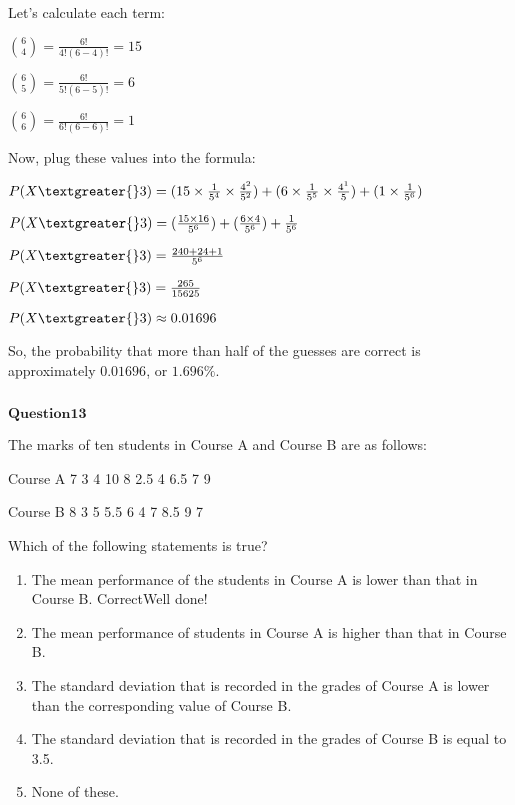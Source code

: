 \documentclass[11pt]{article}
\makeatletter
\providecommand{\tightlist}{%
      \setlength{\itemsep}{0pt}\setlength{\parskip}{0pt}}
\newcommand{\boxspacing}{\kern\kvtcb@left@rule\kern\kvtcb@boxsep}
\newcommand{\prompt}[4]{
        {\ttfamily\llap{{\color{#2}[#3]:\hspace{3pt}#4}}\vspace{-\baselineskip}}
    }
\makeatother
\begin{document}
Let's calculate each term:

$ \binom{6}{4} = \frac{6!}{4!(6-4)!} = 15 $

$ \binom{6}{5} = \frac{6!}{5!(6-5)!} = 6 $

$ \binom{6}{6} = \frac{6!}{6!(6-6)!} = 1 $

Now, plug these values into the formula:

$ P(X \textgreater{} 3) = (15 \times \frac{1}{5^4}
\times \frac{4^2}{5^2}) + (6 \times \frac{1}{5^5} \times \frac{4^1}{5})
+ (1 \times \frac{1}{5^6}) $

$ P(X \textgreater{} 3) = (\frac{15 \times 16}{5^6}) +
(\frac{6 \times 4}{5^6}) + \frac{1}{5^6} $

$ P(X \textgreater{} 3) = \frac{240 + 24 + 1}{5^6} $

$ P(X \textgreater{} 3) = \frac{265}{15625} $

$ P(X \textgreater{} 3) \approx 0.01696 $

So, the probability that more than half of the guesses are correct is
approximately $ 0.01696 $, or $ 1.696\% $.

    \begin{tcolorbox}[breakable, size=fbox, boxrule=1pt, pad at break*=1mm,colback=cellbackground, colframe=cellborder]
\prompt{In}{incolor}{ }{\boxspacing}
\begin{Verbatim}[commandchars=\\\{\}]

\end{Verbatim}
\end{tcolorbox}

    $\textbf{Question13}$

The marks of ten students in Course A and Course B are as follows:

Course A 7 3 4 10 8 2.5 4 6.5 7 9

Course B 8 3 5 5.5 6 4 7 8.5 9 7

Which of the following statements is true?

\begin{enumerate}
\def\labelenumi{\alph{enumi}.}
\tightlist
\item
  The mean performance of the students in Course A is lower than that in
  Course B. CorrectWell done!\\
\item
  The mean performance of students in Course A is higher than that in
  Course B.\\
\item
  The standard deviation that is recorded in the grades of Course A is
  lower than the corresponding value of Course B.\\
\item
  The standard deviation that is recorded in the grades of Course B is
  equal to 3.5.\\
\item
  None of these.
\end{enumerate}
\end{document}
